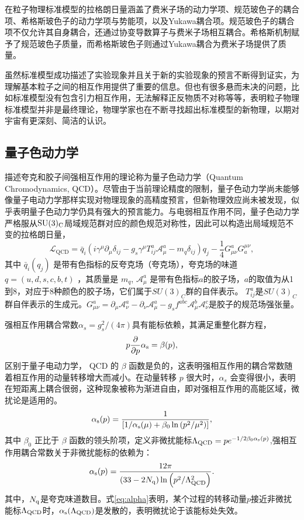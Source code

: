 在粒子物理标准模型的拉格朗日量涵盖了费米子场的动力学项、规范玻色子的耦合项、希格斯玻色子的动力学项与势能项，以及Yukawa耦合项。规范玻色子的耦合项不仅允许其自身耦合，还通过协变导数算子与费米子场相互耦合。希格斯机制赋予了规范玻色子质量，而希格斯玻色子则通过Yukawa耦合为费米子场提供了质量。

虽然标准模型成功描述了实验现象并且关于新的实验现象的预言不断得到证实，为理解基本粒子之间的相互作用提供了重要的信息。但也有很多悬而未决的问题，比如标准模型没有包含引力相互作用，无法解释正反物质不对称等等，表明粒子物理标准模型并非是最终理论，物理学家也在不断寻找超出标准模型的新物理，以期对宇宙有更深刻、简洁的认识。
\subsection{量子色动力学}
描述夸克和胶子间强相互作用的理论称为量子色动力学（Quantum Chromodynamics, QCD）。尽管由于当前理论精度的限制，量子色动力学尚未能够像量子电动力学那样实现对物理现象的高精度预言，但新物理效应尚未被发现，似乎表明量子色动力学仍具有强大的预言能力。与电弱相互作用不同，量子色动力学严格服从$\mathrm{SU(3)_C}$局域规范群对应的颜色规范对称性，因此可以构造出局域规范不变的拉格朗日量，
\begin{equation}
    \mathcal{L}_{\mathrm{QCD}} = \bar{q}_i \left(i \gamma^\mu \partial_\mu \delta_{ij} - g_s \gamma^\mu T_{ij}^a \mathcal{A}_\mu^a - m_q \delta_{ij}\right) q_j - \frac{1}{4} G_{\mu \nu}^a G_a^{\mu \nu},
    \label{eq:QCD_l}
\end{equation}
其中 $\bar{q}_i\left(q_j\right)$ 是带有色指标的反夸克场（夸克场），夸克场的味道 $q=(u, d, s, c, b, t)$ ，其质量是 $m_q$, $\mathcal{A}_\mu^a$ 是带有色指标$a$的胶子场，$a$的取值为从1到8，对应于8种颜色的胶子场，它们属于$SU(3)_C$群的自伴表示。 $T_{ij}^a$是$SU(3)_C$群自伴表示的生成元。$G_{\mu \nu}^a=\partial_\mu \mathcal{A}_\nu^a-\partial_\nu \mathcal{A}_\mu^a-g_s f^{a b c} \mathcal{A}_\mu^b \mathcal{A}_\nu^c$是胶子的规范场强张量。

强相互作用耦合常数$\alpha_s=g_s^2/(4\pi)$具有能标依赖，其满足重整化群方程，
$$
p \frac{\partial}{\partial p} \alpha_{\mathrm{s}}=\beta(p),
$$
区别于量子电动力学， QCD 的 $\beta$ 函数是负的，这表明强相互作用的耦合常数随着相互作用的动量转移增大而减小。在动量转移 $p$ 很大时，$\alpha_s$ 会变得很小，表明在短距离上耦合很弱，这种现象被称为渐进自由，即对强相互作用的高能区域，微扰论是适用的。
$$
\alpha_{\mathrm{s}}(p)=\frac{1}{\left[1 / \alpha_{\mathrm{s}}(\mu)+\beta_0 \ln \left(p^2 / \mu^2\right)\right]},
$$
其中 $\beta_0$ 正比于 $\beta$ 函数的领头阶项，定义非微扰能标$\Lambda_{\mathrm{QCD}}=p e^{-1 / 2 \beta_0 \alpha_{\mathrm{s}}(p)}$,强相互作用耦合常数关于非微扰能标的依赖为：
\begin{equation}
    \alpha_{\mathrm{s}}(p)=\frac{12 \pi}{\left(33-2 N_{\mathrm{q}}\right) \ln \left(p^2 / \Lambda_{\mathrm{QCD}}^2\right)} .
    \label{eq:alpha}
    \end{equation}
其中，$N_{\mathrm{q}}$是夸克味道数目。式\eqref{eq:alpha}表明，某个过程的转移动量$p$接近非微扰能标$\Lambda_{\mathrm{QCD}}$时，$ \alpha_{\mathrm{s}}(\Lambda_{\mathrm{QCD}})$是发散的，表明微扰论于该能标处失效。

